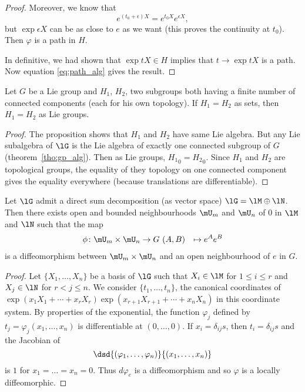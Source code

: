 \begin{proof}
Moreover, we know that
\[
  e^{(t_0+\epsilon)X}=e^{t_0X}e^{\epsilon X},
\]
but $\exp \epsilon X$ can be as close to $e$ as we want (this proves the continuity at $t_0$). Then $\varphi$ is a path in $H$.

In definitive, we had shown that $\exp tX\in H$ implies that $t\to\exp tX$ is a path. Now equation \eqref{eq:path_alg} gives the result.

\end{proof}

\begin{corollary}
Let $G$ be a Lie group and $H_1$, $H_2$, two subgroups both having a finite number of connected components (each for his own topology). If $H_1=H_2$ as sets, then $H_1=H_2$ as Lie groups.
\end{corollary}

\begin{proof}
The proposition shows that $H_1$ and $H_2$ have same Lie algebra. But any Lie subalgebra of $\lG$ is the Lie algebra of exactly one connected subgroup of $G$ (theorem~\ref{tho:gp_alg}). Then as Lie groups, ${H_1}_0={H_2}_0$. Since $H_1$ and $H_2$ are topological groups, the equality of they topology on one connected component gives the equality everywhere (because translations are differentiable).
\end{proof}

\begin{lemma}
Let $\lG$ admit a direct sum decomposition (as vector space) $\lG=\lM\oplus\lN$. Then there exists open and bounded neighbourhoods $\mU_m$ and $\mU_n$ of $0$ in $\lM$ and $\lN$ such that the map
		\begin{equation}
		\begin{aligned}
			\phi \colon \mU_m\times\mU_n &\to G\
			(A,B)&\mapsto e^Ae^B
		\end{aligned}
	\end{equation}
is a diffeomorphism between $\mU_m\times\mU_n$ and an open neighbourhood of $e$ in $G$.
 \label{lem:decomp}
\end{lemma}


\begin{proof}
Let $\{X_1,\ldots,X_n\}$ be a basis of $\lG$ such that $X_i\in\lM$ for $1\leq i\leq r$ and $X_j\in\lN$ for $r<j\leq n$. We consider $\{t_1,\ldots,t_n\}$, the canonical coordinates of $\exp(x_1X_1+\cdots+x_rX_r)\exp(x_{r+1}X_{r+1}+\cdots+x_nX_n)$ in this coordinate system. By properties of the exponential, the function $\varphi_j$ defined by $t_j=\varphi_j(x_1,\ldots,x_n)$ is differentiable at $(0,\ldots,0)$. If $x_i=\delta_{ij}s$, then $t_i=\delta_{ij}s$ and the Jacobian of
\[
   \dsd{(\varphi_1,\ldots,\varphi_n)}{(x_1,\ldots,x_n)}
\]
is $1$ for $x_1=\ldots=x_n=0$. Thus $d\varphi_e$ is a diffeomorphism and so $\varphi$ is a locally diffeomorphic.
\end{proof}

